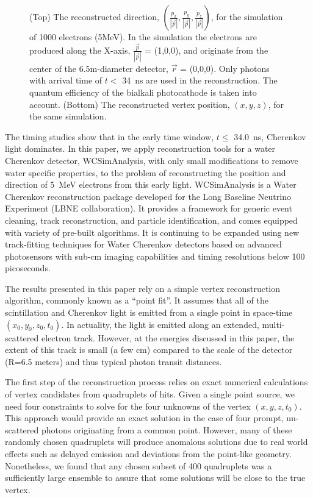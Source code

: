 \documentclass[aps,prc,twocolumn,groupedaddress,showpacs,amsmath,amssymb,floatfix,superscriptaddress]{revtex4}
\begin{document}
\begin{figure}[tbh]
\begin{center}
        \caption[]{\label{fig:reco} (Top) The reconstructed direction,
        $(\frac{p_x}{|\vec{p}|}, \frac{p_y}{|\vec{p}|},
        \frac{p_z}{|\vec{p}|})$, for the simulation of 1000 electrons
        (5MeV). In the simulation the electrons are produced along the
        X-axis, $\frac{\vec{p}}{|\vec{p}|}$ = (1,0,0), and originate
        from the center of the 6.5m-diameter detector, $\vec{r}$ =
        (0,0,0). Only photons with arrival time of $t<$ 34~ns are used
        in the reconstruction. The quantum efficiency of the bialkali
        photocathode is taken into account. (Bottom) The reconstructed
        vertex position, $(x,y,z)$, for the same simulation.}

\end{center}
\end{figure}

The timing studies show that in the early time window, $t\leq$ 34.0~ns, Cherenkov light dominates. In this paper, we apply reconstruction tools for a water Cherenkov detector, WCSimAnalysis, with only small modifications to remove water specific properties, to the problem of reconstructing the position and direction of 5~MeV electrons from this early light.  
WCSimAnalysis is a Water Cherenkov reconstruction package developed for the Long Baseline Neutrino Experiment (LBNE
collaboration)\cite{Blake}. It provides a framework for generic event
cleaning, track reconstruction, and particle identification, and 
comes equipped with variety of pre-built algorithms. It is continuing to be expanded using new
track-fitting techniques for Water Cherenkov detectors\cite{Sanchez2012525} based on
advanced photosensors with sub-cm imaging capabilities and timing
resolutions below 100 picoseconds\cite{LAPPDSum,LAPPDTDR}. 

The results presented in this paper rely on a simple vertex
reconstruction algorithm, commonly known as a ``point
fit''\cite{SuperKalgo}. It assumes that all of the scintillation and
Cherenkov light is emitted from a single point in space-time
$(x_0,y_0,z_0,t_0)$. In actuality, the light is emitted along an
extended, multi-scattered electron track. However, at the energies
discussed in this paper, the extent of this track is small (a few cm)
compared to the scale of the detector (R=6.5 meters) and thus typical
photon transit distances.

The first step of the reconstruction process relies on exact numerical
calculations of vertex candidates from quadruplets of hits. Given a
single point source, we need four constraints to solve for the four
unknowns of the vertex $(x,y,z,t_0)$\cite{Smy}. This approach
would provide an exact solution in the case of four prompt,
un-scattered photons originating from a common point. However, many of
these randomly chosen quadruplets will produce anomalous solutions due
to real world effects such as delayed emission and deviations from the
point-like geometry. Nonetheless, we found that any chosen subset of
400 quadruplets was a sufficiently large ensemble to assure that some
solutions will be close to the true vertex.
\end{document}
